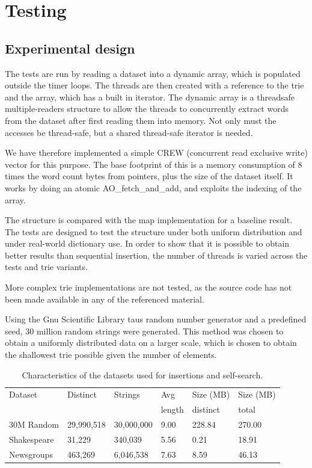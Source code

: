 \chapter{Testing}

\section{Experimental design}
The tests are run by reading a dataset into a dynamic array, which is populated
outside the timer loops. The threads are then created with a reference to the
trie and the array, which has a built in iterator. 
The dynamic array is a threadsafe multiple-readers structure to
allow the threads to concurrently extract words from the dataset after first
reading them into memory. Not only must the accesses be thread-safe, but
a shared thread-safe iterator is needed.

We have therefore implemented a simple CREW (concurrent read exclusive write)
vector for this purpose. The base footprint of this is a memory consumption
of 8 times the word count bytes from pointers, plus the size of the dataset
itself. It works by doing an atomic {\keyword AO\_fetch\_and\_add}, and
exploits the indexing of the array.

The structure is compared with the \STL map implementation for a baseline result.
The tests are designed to test the structure under both uniform distribution and
under real-world dictionary use. In order to show that it is possible to obtain
better results than sequential insertion, the number of threads is varied
across the tests and trie variants.

More complex trie implementations are not tested, as the source code has not
been made available in any of the referenced material.

Using the Gnu Scientific Library taus random number generator and a predefined
seed, 30 million random strings were generated. This method was chosen to
obtain a uniformly distributed data on a larger scale, which is chosen to
obtain the shallowest trie possible given the number of elements.

\begin{table}[h!]
    \centering
    \begin{tabular}[here]{l l l l l l}
        \hline
        Dataset    & Distinct   & Strings      & Avg     & Size (MB)& Size (MB)\\
                   &            &              & length  & distinct & total    \\\hline
        30M Random & 29,990,518 & 30,000,000   & 9.00    & 228.84   & 270.00\\
        Shakespeare&  31,229    & 340,039      & 5.56    & 0.21     & 18.91\\
        Newsgroups & 463,269    & 6,046,538    & 7.63    & 8.59     & 46.13\\
        \hline
    \end{tabular}
    \caption{Characteristics of the datasets used for insertions and self-search.}
    \label{tab:datasets}
\end{table}

